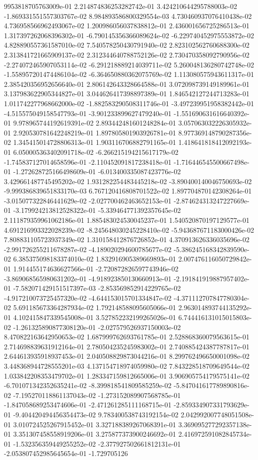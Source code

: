9953818705763009e-01	2.214874836253282742e-01	3.424210644295788003e-02	-1.869331551557303767e-02	8.984893586800329554e-03	4.730460937076410438e-02	4.736958566962493067e-02	1.200986056037838812e-01	2.436001656725286513e-01	1.317397262068396302e-01	-6.790145356366089624e-02	-6.229740452975553872e-02	4.828890557361587010e-02	7.540578250430791940e-02	2.823102562760688300e-02	2.313841721665909137e-02	2.312344640788752126e-02	2.730470358092790956e-02	-2.274072465907053114e-02	-6.291218889214039711e-02	5.260048136280742748e-02	-1.558957201474486104e-02	-6.364650880362075769e-02	1.113080575943611317e-01	2.385420356952656640e-01	2.806142643328664588e-01	3.072098739149189961e-01	3.137983622905344827e-01	3.044626417398897389e-01	1.846542127244713283e-01	1.011742277968662000e-02	-1.882583290508311746e-01	-3.497239951958382442e-01	-4.515575049158547793e-01	-3.901233899627479240e-01	-1.551690631616640392e-01	9.978965744192619391e-02	2.893442481601248284e-01	3.057063032226305932e-01	2.920530781642248219e-01	1.897805801903926781e-01	8.977369148790287356e-02	1.345415014728806313e-01	1.903116706882791165e-01	1.418641818412092193e-01	6.050005363402091718e-02	-6.266215194215617179e-02	-1.745837127014658596e-01	-2.110452091817238418e-01	-1.716446545500667498e-01	-1.272628725166498609e-01	-6.013400335087423776e-02	3.429661487745495202e-02	1.931282254483445218e-02	-3.890400140046750693e-02	-9.999386839651833170e-03	6.767120416808701522e-02	1.897704870142308264e-01	-3.015077322846441629e-02	-2.027700462463652153e-01	-2.874624313247227669e-01	-3.179924213812528322e-01	-5.339464771392357645e-02	2.111879359961062186e-01	1.885483024530045237e-01	1.540520870197129577e-01	4.691216993322028239e-02	-8.245648030245228410e-02	-5.943687671183000426e-02	7.808831105723937349e-02	1.310158412876726852e-01	4.370913626336035696e-02	-2.991726255211678287e-02	-4.189020294600785677e-02	-5.386245168342839590e-02	6.385375098183374010e-02	1.832916905389669893e-01	2.007476116050729842e-01	1.914455174636627566e-01	-2.720872826597743946e-02	-3.869068565980631202e-01	-4.918923850130660913e-01	-2.191841919887957402e-01	-7.582071429151517397e-03	-2.853569852914229765e-02	-4.917210073725457320e-02	-4.644153015701334847e-02	-4.371112707847780304e-02	5.691185673364287934e-02	1.792148588095605066e-01	2.963014893744135292e-01	4.102415847339545008e-01	3.527852232199265026e-01	6.744416131015015803e-02	-1.261325890877308120e-01	-2.027579526937150003e-02	8.470822163642950653e-02	1.687999762693761785e-01	2.528868360079563615e-01	2.714698839631912164e-01	2.780504235245983002e-01	2.740885424387787817e-01	2.644613935918937453e-01	2.040508829873044216e-01	8.299762496650001098e-02	3.448368944728555201e-03	4.137154718974059980e-02	7.843228518709649544e-02	1.033842208353479702e-01	1.283347159812665006e-01	3.906905754179575141e-02	-6.701071342352635241e-02	-8.399818541809585259e-02	-5.847041617789890816e-02	-7.195270118861137043e-02	-1.273152089907568785e-01	-1.847058689253474606e-01	-2.471261285111168715e-01	-2.859334907331793629e-01	-9.404420494456354473e-02	9.783400538743192154e-02	2.042992007748051508e-01	3.010724525267915452e-01	3.327188389267068391e-01	3.369095277292357138e-01	3.351307458558919206e-01	3.275877373900246692e-01	2.416972591082845734e-01	-1.532356359449255252e-02	-2.377927502661812131e-01	-2.053807452985645654e-01	-1.729705126